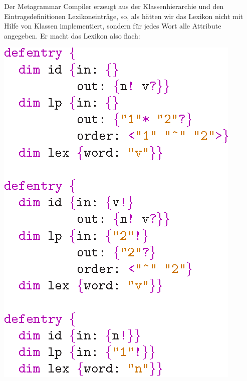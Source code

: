 Der Metagrammar Compiler erzeugt aus der Klassenhierarchie und den
Eintragsdefinitionen Lexikoneintr\"age, so, als h\"atten wir das
Lexikon nicht mit Hilfe von Klassen implementiert, sondern f\"ur jedes
Wort alle Attribute angegeben. Er macht das Lexikon also flach:
\begin{center}
\includegraphics[scale=1.0]{eps/lexflat}
\end{center}



